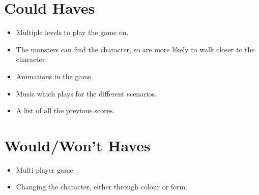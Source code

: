 \section{Could Haves}

\begin{itemize}
\itemsep0em 
  \item Multiple levels to play the game on.
  \item The monsters can find the character, so are more likely to walk closer to the character.
  \item Animations in the game
  \item Music which plays for the different scenarios.  
  \item A list of all the previous scores.
\end{itemize}

\section{Would/Won't Haves}
\begin{itemize}
\itemsep0em 
	\item Multi player game
	\item Changing the character, either through colour or form.
\end{itemize}
